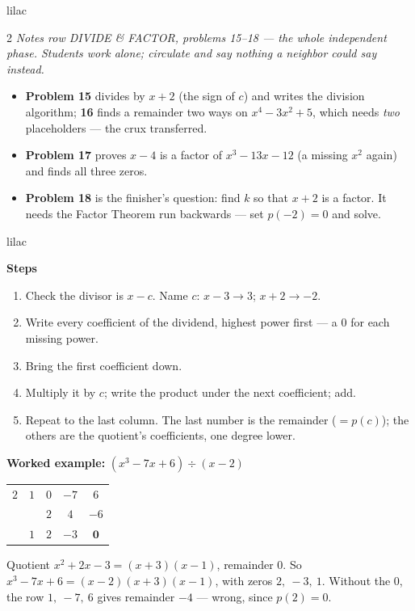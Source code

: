 \documentclass[10pt]{article}
\begin{document}
\begin{skillbox}{lilac}
\begin{multicols}{2}
\textit{Notes row DIVIDE \& FACTOR, problems 15--18 --- the whole independent phase. Students
work alone; circulate and say nothing a neighbor could say instead.}
\begin{itemize}
  \item \textbf{Problem 15} divides by $x + 2$ (the sign of $c$) and writes the division
        algorithm; \textbf{16} finds a remainder two ways on $x^4 - 3x^2 + 5$, which needs
        \emph{two} placeholders --- the crux transferred.
  \item \textbf{Problem 17} proves $x - 4$ is a factor of $x^3 - 13x - 12$ (a missing $x^2$
        again) and finds all three zeros.
  \item \textbf{Problem 18} is the finisher's question: find $k$ so that $x + 2$ is a factor.
        It needs the Factor Theorem run backwards --- set $p(-2) = 0$ and solve.
\end{itemize}
\end{multicols}
\end{skillbox}

\begin{skillbox}{lilac}
\begin{minipage}[t]{0.48\linewidth}
\textbf{Steps}
\begin{enumerate}[itemsep=2pt]
  \item Check the divisor is $x - c$. Name $c$: $x - 3 \to 3$; $x + 2 \to -2$.
  \item Write every coefficient of the dividend, highest power first --- a $0$ for each
        missing power.
  \item Bring the first coefficient down.
  \item Multiply it by $c$; write the product under the next coefficient; add.
  \item Repeat to the last column. The last number is the remainder ($= p(c)$); the others are
        the quotient's coefficients, one degree lower.
\end{enumerate}
\end{minipage}\hfill
\begin{minipage}[t]{0.48\linewidth}
\textbf{Worked example:} $(x^3 - 7x + 6) \div (x - 2)$

\smallskip
\begin{center}
{\setlength{\tabcolsep}{4pt}\begin{tabular}{c|cccc}
 $2$ & $1$ & $0$ & $-7$ & $6$ \\
     &     & $2$ & $4$  & $-6$ \\ \hline
     & $1$ & $2$ & $-3$ & $\mathbf{0}$ \\
\end{tabular}}
\end{center}

\smallskip
Quotient $x^2 + 2x - 3 = (x + 3)(x - 1)$, remainder $0$. So
$x^3 - 7x + 6 = (x - 2)(x + 3)(x - 1)$, with zeros $2,\ -3,\ 1$. Without the $0$, the row
$1,\ -7,\ 6$ gives remainder $-4$ --- wrong, since $p(2) = 0$.
\end{minipage}
\end{skillbox}
\end{document}

